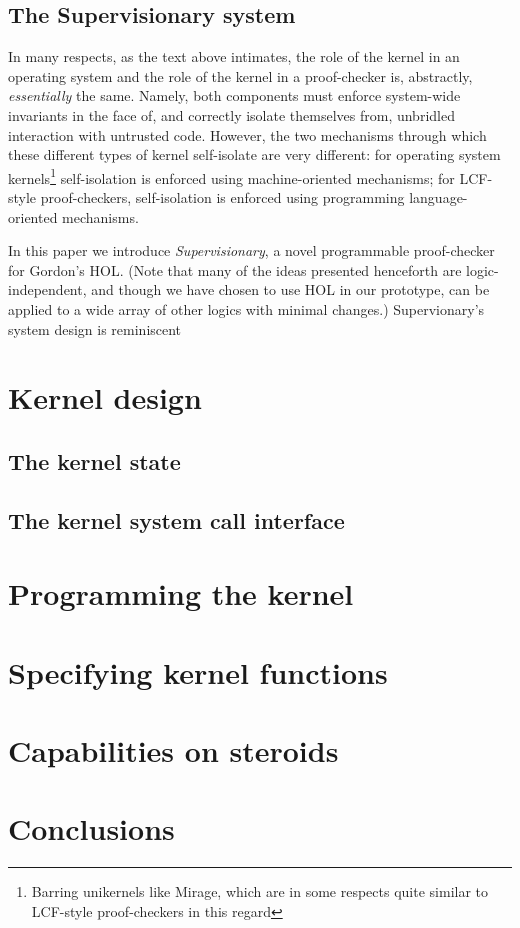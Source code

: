 \documentclass[a4paper, UKenglish, cleveref, autoref, thm-restate]{lipics-v2021}
\begin{document}
\subsection{The Supervisionary system}

In many respects, as the text above intimates, the role of the kernel in an operating system and the role of the kernel in a proof-checker is, abstractly, \emph{essentially} the same.
Namely, both components must enforce system-wide invariants in the face of, and correctly isolate themselves from, unbridled interaction with untrusted code.
However, the two mechanisms through which these different types of kernel self-isolate are very different: for operating system kernels\footnote{Barring unikernels like Mirage, which are in some respects quite similar to LCF-style proof-checkers in this regard} self-isolation is enforced using machine-oriented mechanisms; for LCF-style proof-checkers, self-isolation is enforced using programming language-oriented mechanisms.

In this paper we introduce \emph{Supervisionary}, a novel programmable proof-checker for Gordon's HOL.
(Note that many of the ideas presented henceforth are logic-independent, and though we have chosen to use HOL in our prototype, can be applied to a wide array of other logics with minimal changes.)
Supervionary's system design is reminiscent 

\section{Kernel design}
\label{sect.kernel.design}

\subsection{The kernel state}

\subsection{The kernel system call interface}

\section{Programming the kernel}
\label{sect.programming.the.kernel}

\section{Specifying kernel functions}
\label{sect.specifying.kernel.functions}

\section{Capabilities on steroids}
\label{sect.capabilities.on.steroids}

\section{Conclusions}
\label{sect.conclusions}
\end{document}
